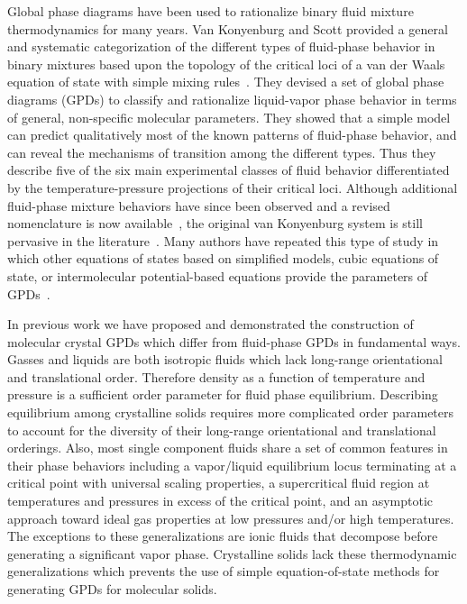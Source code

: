 \documentclass[preprint]{iucr}              %
\begin{document}
Global phase diagrams have been used to rationalize binary fluid mixture
thermodynamics for many years.  Van Konyenburg and Scott provided a general and
systematic categorization of the different types of fluid-phase behavior in
binary mixtures based upon the topology of the critical loci of a van der Waals
equation of state with simple mixing rules~\cite{vanKonyenburg80}.  They
devised a set of global phase diagrams (GPDs) to classify and rationalize
liquid-vapor phase behavior in terms of general, non-specific molecular
parameters.  They showed that a simple model can predict qualitatively most of
the known patterns of fluid-phase behavior, and can reveal the mechanisms of
transition among the different types.  Thus they describe five of the six main
experimental classes of fluid behavior differentiated by the
temperature-pressure projections of their critical loci.  Although additional
fluid-phase mixture behaviors have since been observed and a revised
nomenclature is now available~\cite{Bolz98}, the original van Konyenburg system
is still pervasive in the
literature~\cite{AparicioMartinez07a,AparicioMartinez07b,Cismondi07}. Many
authors have repeated this type of study in which other equations of states
based on simplified models, cubic equations of state, or intermolecular
potential-based equations provide the parameters of
GPDs~\cite{Polishuk00,Polishuk02,vanPelt95}.
 
In previous work we have proposed and demonstrated the construction of molecular
crystal GPDs which differ from fluid-phase GPDs in fundamental ways.  Gasses and
liquids are both isotropic fluids which lack long-range orientational and
translational order.  Therefore density as a function of temperature and
pressure is a sufficient order parameter for fluid phase equilibrium. 
Describing equilibrium among crystalline solids requires more complicated order
parameters to account for the diversity of their long-range orientational and
translational orderings.  Also, most single component fluids share a set of
common features in their phase behaviors including a vapor/liquid equilibrium
locus terminating at a critical point with universal scaling properties, a
supercritical fluid region at temperatures and pressures in excess of the
critical point, and an asymptotic approach toward ideal gas properties at low
pressures and/or high temperatures.  The exceptions to these generalizations are
ionic fluids that decompose before generating a significant vapor phase. 
Crystalline solids lack these thermodynamic generalizations which prevents the
use of simple equation-of-state methods for generating GPDs for molecular
solids.
\end{document}
